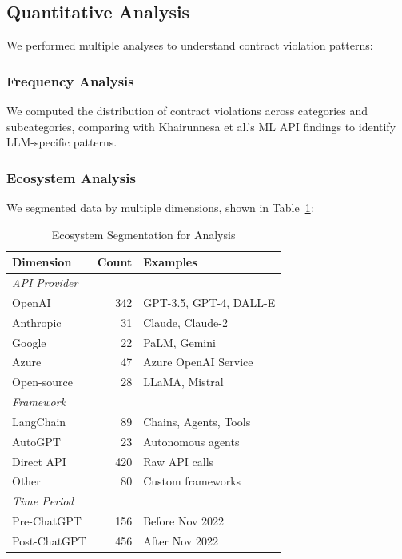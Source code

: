 \documentclass[11pt]{article}
\begin{document}
\subsection{Quantitative Analysis}

We performed multiple analyses to understand contract violation patterns:

\subsubsection{Frequency Analysis}
We computed the distribution of contract violations across categories and subcategories, comparing with Khairunnesa et al.'s ML API findings to identify LLM-specific patterns.

\subsubsection{Ecosystem Analysis}
We segmented data by multiple dimensions, shown in Table~\ref{tab:ecosystem_segmentation}:

\begin{table}[h]
\centering
\caption{Ecosystem Segmentation for Analysis}
\label{tab:ecosystem_segmentation}
\begin{tabular}{lrl}
\toprule
\textbf{Dimension} & \textbf{Count} & \textbf{Examples} \\
\midrule
\multicolumn{3}{l}{\textit{API Provider}} \\
OpenAI & 342 & GPT-3.5, GPT-4, DALL-E \\
Anthropic & 31 & Claude, Claude-2 \\
Google & 22 & PaLM, Gemini \\
Azure & 47 & Azure OpenAI Service \\
Open-source & 28 & LLaMA, Mistral \\
\midrule
\multicolumn{3}{l}{\textit{Framework}} \\
LangChain & 89 & Chains, Agents, Tools \\
AutoGPT & 23 & Autonomous agents \\
Direct API & 420 & Raw API calls \\
Other & 80 & Custom frameworks \\
\midrule
\multicolumn{3}{l}{\textit{Time Period}} \\
Pre-ChatGPT & 156 & Before Nov 2022 \\
Post-ChatGPT & 456 & After Nov 2022 \\
\bottomrule
\end{tabular}
\end{table}
\end{document}
